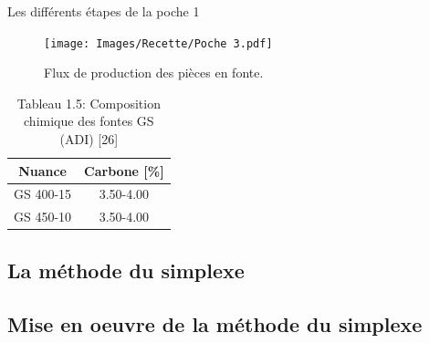 \documentclass[12pt]{article}
\begin{document}
Les différents étapes  de la poche 1









\begin{figure}[H]
    \centering
    \begin{adjustbox}{width=1.3\textwidth,center}
        \texttt{[image: Images/Recette/Poche 3.pdf]}
    \end{adjustbox}
    \caption{Flux de production des pièces en fonte.}
    \label{fig:Poche3}
\end{figure}






\begin{table}[H]
    \caption{Tableau 1.5: Composition chimique des fontes GS (ADI) [26]}
    \centering
        \begin{tabular}{|c|c|}
        \hline
        Nuance & Carbone [\%] \\ \hline
        GS 400-15 & 3.50-4.00  \\ \hline
        GS 450-10 & 3.50-4.00  \\ \hline
        \end{tabular}
\end{table}
    
    

\subsection{La méthode du simplexe}

\subsection{Mise en oeuvre de la méthode du simplexe}
\end{document}
